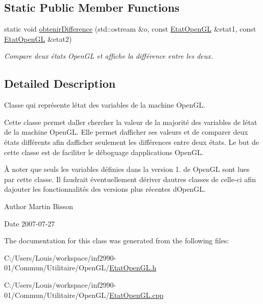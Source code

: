 \subsection*{Static Public Member Functions}
\begin{DoxyCompactItemize}
\item 
static void \hyperlink{group__utilitaire_ga24ddfdab3e65cc4069b86ba84d3f565b}{obtenir\+Difference} (std\+::ostream \&o, const \hyperlink{class_etat_open_g_l}{Etat\+Open\+G\+L} \&etat1, const \hyperlink{class_etat_open_g_l}{Etat\+Open\+G\+L} \&etat2)
\begin{DoxyCompactList}\small\item\em Compare deux états Open\+G\+L et affiche la différence entre les deux. \end{DoxyCompactList}\end{DoxyCompactItemize}


\subsection{Detailed Description}
Classe qui représente l\textquotesingle{}état des variables de la machine Open\+G\+L. 

Cette classe permet d\textquotesingle{}aller chercher la valeur de la majorité des variables de l\textquotesingle{}état de la machine Open\+G\+L. Elle permet d\textquotesingle{}afficher ses valeurs et de comparer deux états différents afin d\textquotesingle{}afficher seulement les différences entre deux états. Le but de cette classe est de faciliter le déboguage d\textquotesingle{}applications Open\+G\+L.

À noter que seuls les variables définies dans la version 1. de Open\+G\+L sont lues par cette classe. Il faudrait éventuellement dériver d\textquotesingle{}autres classes de celle-\/ci afin d\textquotesingle{}ajouter les fonctionnalités des versions plus récentes d\textquotesingle{}Open\+G\+L.

\begin{DoxyAuthor}{Author}
Martin Bisson 
\end{DoxyAuthor}
\begin{DoxyDate}{Date}
2007-\/07-\/27 
\end{DoxyDate}


The documentation for this class was generated from the following files\+:\begin{DoxyCompactItemize}
\item 
C\+:/\+Users/\+Louis/workspace/inf2990-\/01/\+Commun/\+Utilitaire/\+Open\+G\+L/\hyperlink{_etat_open_g_l_8h}{Etat\+Open\+G\+L.\+h}\item 
C\+:/\+Users/\+Louis/workspace/inf2990-\/01/\+Commun/\+Utilitaire/\+Open\+G\+L/\hyperlink{_etat_open_g_l_8cpp}{Etat\+Open\+G\+L.\+cpp}\end{DoxyCompactItemize}
